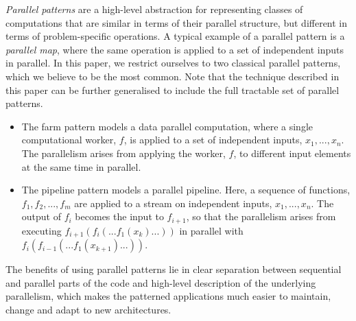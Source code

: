 \noindent
\emph{Parallel patterns} are a high-level abstraction for representing classes of computations that are similar in terms of their parallel structure, but different in terms of problem-specific operations. A typical example of a parallel pattern is a \emph{parallel map}, where the same operation is applied to a set of independent inputs in parallel. 
In this paper, we restrict ourselves to two classical parallel patterns, which we believe to be the most common. Note that the technique described in this paper can be further generalised to include the full tractable set of parallel patterns.
\begin{itemize}
    \item The farm pattern models a data parallel computation, where a single computational worker, $f$, is applied to a set of independent inputs, $x_{1}, ..., x_{n}$. The parallelism arises from applying the worker, $f$, to different input elements at the same time in parallel. 
    \item The pipeline pattern models a parallel pipeline. Here, a sequence of functions, $f_{1}, f_{2}, ..., f_{m}$ are applied to a stream on independent inputs, $x_{1}, ..., x_{n}$. The output of $f_{i}$ becomes the input to $f_{i+1}$, so that the parallelism arises from executing $f_{i+1}(f_{i}(...f_{1}(x_{k})...))$ in parallel with $f_{i}(f_{i-1}(...f_{1}(x_{k+1})...))$.
\end{itemize}

The benefits of using parallel patterns lie in clear separation between sequential and parallel parts of the code and high-level description of the underlying parallelism, which makes the patterned applications much easier to maintain, change and adapt to new architectures. 

